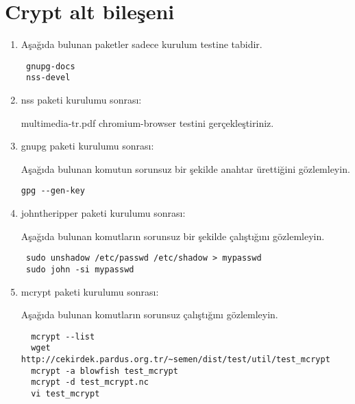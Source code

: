 \documentclass[a4paper,10pt]{article}
\begin{document}
\section{Crypt alt bileşeni}
\begin{enumerate}
\item Aşağıda bulunan paketler sadece kurulum testine tabidir.

\begin{verbatim}
 gnupg-docs
 nss-devel
\end{verbatim}

\item nss paketi kurulumu sonrası:

multimedia-tr.pdf chromium-browser testini gerçekleştiriniz.

\item gnupg paketi kurulumu sonrası:

Aşağıda bulunan komutun sorunsuz bir şekilde anahtar ürettiğini gözlemleyin.
\begin{verbatim}
gpg --gen-key
\end{verbatim}

\item johntheripper paketi kurulumu sonrası:

Aşağıda bulunan komutların sorunsuz bir şekilde çalıştığını gözlemleyin.
\begin{verbatim}
 sudo unshadow /etc/passwd /etc/shadow > mypasswd
 sudo john -si mypasswd 
\end{verbatim}

 \item mcrypt paketi kurulumu sonrası:

Aşağıda bulunan komutların sorunsuz çalıştığını gözlemleyin.
\begin{verbatim}
  mcrypt --list
  wget http://cekirdek.pardus.org.tr/~semen/dist/test/util/test_mcrypt
  mcrypt -a blowfish test_mcrypt
  mcrypt -d test_mcrypt.nc
  vi test_mcrypt
\end{verbatim}


\end{enumerate}
\end{document}
